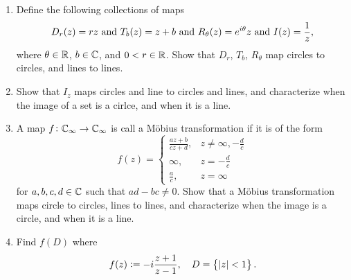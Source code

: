 \documentclass[11pt,a4paper]{article}
\begin{document}
\begin{exercise} \phantom{}
  \begin{enumerate}
    \item[(1)] Define the following collections of maps
      \[
        D_r(z) = r z \text{ and }
        T_b(z) = z + b \text{ and }
        R_{\theta}(z) = e^{i \theta} z \text{ and }
        I(z) = \frac{1}{z},
      \]
      where $\theta \in \mathbb{R}$, $b \in \mathbb{C}$, and $0 < r \in \mathbb{R}$.
      Show that $D_r$, $T_b$, $R_{\theta}$ map circles to circles,
      and lines to lines.
    \item[(2)] Show that $I_z$ maps circles and line to
      circles and lines,
      and characterize when the image of a set is a cirlce,
      and when it is a line.
    \item[(3)] A map $f \colon \mathbb{C}_{\infty} \to \mathbb{C}_{\infty}$ is
      call a M\"obius transformation if it is of the form
      \[
        f(z) =
        \begin{cases}
          \frac{a z + b}{c z + d}, &z \neq \infty,-\frac{d}{c} \\
          \infty, &z = -\frac{d}{c} \\
          \frac{a}{c}, &z = \infty
        \end{cases}
      \]
      for $a,b,c,d \in \mathbb{C}$ such that $ad - bc \neq 0$.
      Show that a M\"obius transformation maps circle to circles,
      lines to lines, and characterize when the image is a circle,
      and when it is a line.
    \item[(4)] Find $f(D)$ where
      \[
        f(z) := -i \frac{z + 1}{z - 1}, \quad
        D = \left\{\left\lvert z\right\rvert < 1\right\}.
      \]
  \end{enumerate}
\end{exercise}
\end{document}
